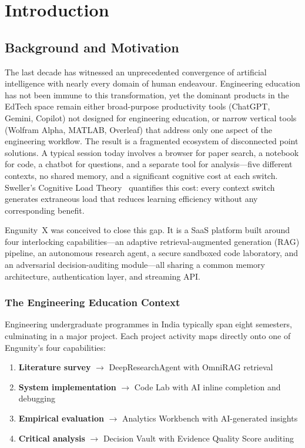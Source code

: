 \chapter{Introduction}
\label{chap:intro}

\section{Background and Motivation}
\label{sec:background}

The last decade has witnessed an unprecedented convergence of artificial intelligence with nearly every domain of human endeavour. Engineering education has not been immune to this transformation, yet the dominant products in the EdTech space remain either broad-purpose productivity tools (ChatGPT, Gemini, Copilot) not designed for engineering education, or narrow vertical tools (Wolfram Alpha, MATLAB, Overleaf) that address only one aspect of the engineering workflow. The result is a fragmented ecosystem of disconnected point solutions. A typical session today involves a browser for paper search, a notebook for code, a chatbot for questions, and a separate tool for analysis---five different contexts, no shared memory, and a significant cognitive cost at each switch. Sweller's Cognitive Load Theory~\citep{sweller1988cognitive} quantifies this cost: every context switch generates extraneous load that reduces learning efficiency without any corresponding benefit.

Engunity~X was conceived to close this gap. It is a SaaS platform built around four interlocking capabilities---an adaptive retrieval-augmented generation (RAG) pipeline, an autonomous research agent, a secure sandboxed code laboratory, and an adversarial decision-auditing module---all sharing a common memory architecture, authentication layer, and streaming API.

\subsection{The Engineering Education Context}
\label{subsec:edu-context}

Engineering undergraduate programmes in India typically span eight semesters, culminating in a major project. Each project activity maps directly onto one of Engunity's four capabilities:

\begin{enumerate}
    \item \textbf{Literature survey} $\rightarrow$ DeepResearchAgent with OmniRAG retrieval
    \item \textbf{System implementation} $\rightarrow$ Code Lab with AI inline completion and debugging
    \item \textbf{Empirical evaluation} $\rightarrow$ Analytics Workbench with AI-generated insights
    \item \textbf{Critical analysis} $\rightarrow$ Decision Vault with Evidence Quality Score auditing
\end{enumerate}

